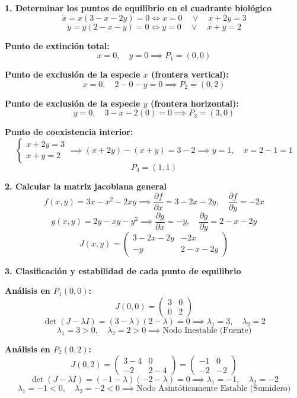 \documentclass[11pt,a4paper]{article}
\newenvironment{solucion}[1][Solución Detallada]{%
    \vspace{1.5mm}%
    \noindent{\large\textbf{Solución:}}\par\vspace{1.5mm}%
}{%
    \par\vspace{3mm}%
}
\begin{document}
\begin{solucion}

\textbf{\large 1. Determinar los puntos de equilibrio en el cuadrante biológico}
\[
\dot{x} = x(3 - x - 2y) = 0 \iff x = 0 \quad \lor \quad x + 2y = 3
\]
\[
\dot{y} = y(2 - x - y) = 0 \iff y = 0 \quad \lor \quad x + y = 2
\]

\textbf{Punto de extinción total:}
\[
x = 0, \quad y = 0 \implies \boxed{P_1 = (0, 0)}
\]

\textbf{Punto de exclusión de la especie $x$ (frontera vertical):}
\[
x = 0, \quad 2 - 0 - y = 0 \implies \boxed{P_2 = (0, 2)}
\]

\textbf{Punto de exclusión de la especie $y$ (frontera horizontal):}
\[
y = 0, \quad 3 - x - 2(0) = 0 \implies \boxed{P_3 = (3, 0)}
\]

\textbf{Punto de coexistencia interior:}
\[
\begin{cases}
x + 2y = 3 \\
x + y = 2
\end{cases}
\implies (x + 2y) - (x + y) = 3 - 2 \implies y = 1, \quad x = 2 - 1 = 1
\]
\[
\boxed{P_4 = (1, 1)}
\]

\vspace{3.5mm}

\textbf{\large 2. Calcular la matriz jacobiana general}
\[
f(x, y) = 3x - x^2 - 2xy \implies \frac{\partial f}{\partial x} = 3 - 2x - 2y, \quad \frac{\partial f}{\partial y} = -2x
\]
\[
g(x, y) = 2y - xy - y^2 \implies \frac{\partial g}{\partial x} = -y, \quad \frac{\partial g}{\partial y} = 2 - x - 2y
\]
\[
\boxed{J(x, y) = \begin{pmatrix} 3 - 2x - 2y & -2x \\ -y & 2 - x - 2y \end{pmatrix}}
\]

\vspace{3.5mm}

\textbf{\large 3. Clasificación y estabilidad de cada punto de equilibrio}

\textbf{Análisis en $P_1(0, 0)$:}
\[
J(0, 0) = \begin{pmatrix} 3 & 0 \\ 0 & 2 \end{pmatrix}
\]
\[
\det(J - \lambda I) = (3 - \lambda)(2 - \lambda) = 0 \implies \lambda_1 = 3, \quad \lambda_2 = 2
\]
\[
\boxed{\lambda_1 = 3 > 0, \quad \lambda_2 = 2 > 0 \implies \text{Nodo Inestable (Fuente)}}
\]

\textbf{Análisis en $P_2(0, 2)$:}
\[
J(0, 2) = \begin{pmatrix} 3 - 4 & 0 \\ -2 & 2 - 4 \end{pmatrix} = \begin{pmatrix} -1 & 0 \\ -2 & -2 \end{pmatrix}
\]
\[
\det(J - \lambda I) = (-1 - \lambda)(-2 - \lambda) = 0 \implies \lambda_1 = -1, \quad \lambda_2 = -2
\]
\[
\boxed{\lambda_1 = -1 < 0, \quad \lambda_2 = -2 < 0 \implies \text{Nodo Asintóticamente Estable (Sumidero)}}
\]


\end{solucion}
\end{document}
